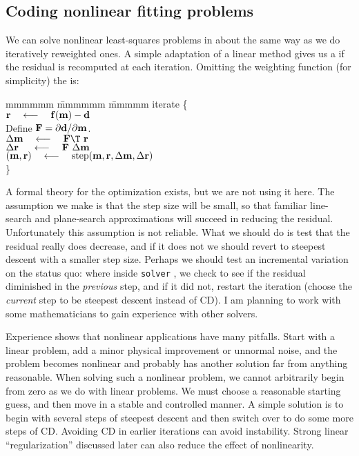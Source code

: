 \subsection{Coding nonlinear fitting problems}
We can solve nonlinear least-squares problems
in about the same way as we do iteratively reweighted ones.
A simple adaptation of a linear method gives us a  if
the residual is recomputed at each iteration.
Omitting the weighting function (for simplicity) the  is:
\begin{tabbing}
mmmmmm \= mmmmmm \= mmmmm \kill
\> {\rm iterate \{ }                                                    \\
\>      \> $\bold r \quad\longleftarrow\quad \bold f( \bold m) - \bold d$       \\
\>      \> Define $\bold F=\partial \bold d/\partial \bold m$.       \\
\>      \>  $\Delta\bold m  \padarrow \bold F\T\         \bold r$ \\
\>      \>  $\Delta\bold r\ \quad\longleftarrow\quad \bold F \ \Delta \bold m$  \\
\>      \>  $(\bold m,\bold r) \quad\longleftarrow\quad {\rm step}
             (\bold m,\bold r, \Delta\bold m,\Delta\bold r )$ \\
\>      \> \}
\end{tabbing}

\par
A formal theory for the optimization exists,
but we are not using it here.
The assumption we make is that the step size will be small,
so that familiar line-search and plane-search approximations
will succeed in reducing the residual.
Unfortunately this assumption is not reliable.
What we should do is test that the residual really does decrease,
and if it does not we should revert
to steepest descent with a smaller step size.
Perhaps we should test an incremental variation on the status quo:
where inside \texttt{solver} ,
we check to see if the residual
diminished in the {\it previous} step, and if it did not,
restart the iteration (choose the {\it current} step to be steepest descent instead of CD).
I am planning to work with some mathematicians
to gain experience with other solvers.

\par
Experience shows that nonlinear applications have many pitfalls.
Start with a linear problem,
add a minor physical improvement or unnormal noise,
and the problem becomes nonlinear and probably has another solution
far from anything reasonable.
When solving such a nonlinear problem,
we cannot arbitrarily begin from zero as we do with linear problems.
We must choose a reasonable starting guess,
and then move in a stable and controlled manner.
A simple solution is to begin with several steps of steepest descent
and then switch over to do some more steps of CD.
Avoiding CD in earlier iterations can avoid instability.
Strong linear ``regularization'' discussed later
can also reduce the effect of nonlinearity.

